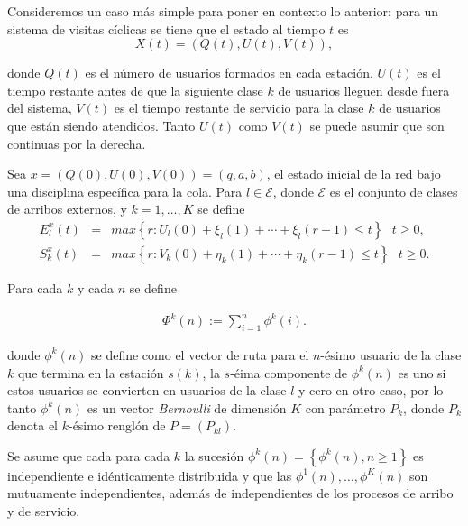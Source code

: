 Consideremos un caso m\'as simple para poner en contexto lo
anterior: para un sistema de visitas c\'iclicas se tiene que el
estado al tiempo $t$ es
\begin{equation}
X\left(t\right)=\left(Q\left(t\right),U\left(t\right),V\left(t\right)\right),
\end{equation}

donde $Q\left(t\right)$ es el n\'umero de usuarios formados en
cada estaci\'on. $U\left(t\right)$ es el tiempo restante antes de
que la siguiente clase $k$ de usuarios lleguen desde fuera del
sistema, $V\left(t\right)$ es el tiempo restante de servicio para
la clase $k$ de usuarios que est\'an siendo atendidos. Tanto
$U\left(t\right)$ como $V\left(t\right)$ se puede asumir que son
continuas por la derecha.

Sea
$x=\left(Q\left(0\right),U\left(0\right),V\left(0\right)\right)=\left(q,a,b\right)$,
el estado inicial de la red bajo una disciplina espec\'ifica para
la cola. Para $l\in\mathcal{E}$, donde $\mathcal{E}$ es el conjunto de clases de arribos externos, y $k=1,\ldots,K$ se define\\
\begin{eqnarray*}
E_{l}^{x}\left(t\right)&=&max\left\{r:U_{l}\left(0\right)+\xi_{l}\left(1\right)+\cdots+\xi_{l}\left(r-1\right)\leq
t\right\}\textrm{   }t\geq0,\\
S_{k}^{x}\left(t\right)&=&max\left\{r:V_{k}\left(0\right)+\eta_{k}\left(1\right)+\cdots+\eta_{k}\left(r-1\right)\leq
t\right\}\textrm{   }t\geq0.
\end{eqnarray*}

Para cada $k$ y cada $n$ se define

\begin{eqnarray*}\label{Eq.phi}
\Phi^{k}\left(n\right):=\sum_{i=1}^{n}\phi^{k}\left(i\right).
\end{eqnarray*}

donde $\phi^{k}\left(n\right)$ se define como el vector de ruta
para el $n$-\'esimo usuario de la clase $k$ que termina en la
estaci\'on $s\left(k\right)$, la $s$-\'eima componente de
$\phi^{k}\left(n\right)$ es uno si estos usuarios se convierten en
usuarios de la clase $l$ y cero en otro caso, por lo tanto
$\phi^{k}\left(n\right)$ es un vector {\em Bernoulli} de
dimensi\'on $K$ con par\'ametro $P_{k}^{'}$, donde $P_{k}$ denota
el $k$-\'esimo rengl\'on de $P=\left(P_{kl}\right)$.

Se asume que cada para cada $k$ la sucesi\'on $\phi^{k}\left(n\right)=\left\{\phi^{k}\left(n\right),n\geq1\right\}$
es independiente e id\'enticamente distribuida y que las
$\phi^{1}\left(n\right),\ldots,\phi^{K}\left(n\right)$ son
mutuamente independientes, adem\'as de independientes de los
procesos de arribo y de servicio.\\

